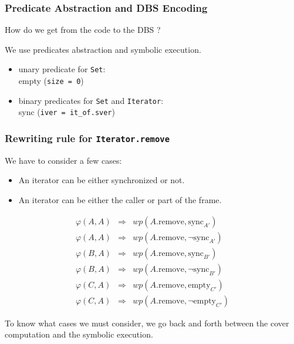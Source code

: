 \documentclass{beamer}
\begin{document}
\begin{frame}
  \frametitle{Predicate Abstraction and DBS Encoding}
  How do we get from the code to the DBS ?

  We use predicates abstraction and symbolic execution.
  \begin{itemize}
  \item unary predicate for {\tt Set}:\\
    empty ({\tt size = 0})
  \item binary predicates for {\tt Set} and {\tt Iterator}:\\
    sync ({\tt iver = it\_of.sver})
  \end{itemize}

\end{frame}

\begin{frame}
  \frametitle{Rewriting rule for {\tt Iterator.remove}}
    
  We have to consider a few cases:
  \begin{itemize}
  \item An iterator can be either synchronized or not.
  \item An iterator can be either the caller or part of the frame.
  \end{itemize}

  \begin{minipage}[b]{5cm}
  \begin{eqnarray*}
    \varphi(A,A) & \Rightarrow & wp(\text{$A$.remove}, \text{sync}_{A'}) \\
    \varphi(A,A) & \Rightarrow & wp(\text{$A$.remove}, \neg\text{sync}_{A'}) \\
    \varphi(B,A) & \Rightarrow & wp(\text{$A$.remove}, \text{sync}_{B'}) \\
    \varphi(B,A) & \Rightarrow & wp(\text{$A$.remove}, \neg\text{sync}_{B'}) \\
    \varphi(C,A) & \Rightarrow & wp(\text{$A$.remove}, \text{empty}_{C'}) \\
    \varphi(C,A) & \Rightarrow & wp(\text{$A$.remove}, \neg\text{empty}_{C'})
  \end{eqnarray*}
  \end{minipage}

  \vspace{2ex}

  To know what cases we must consider, we go back and forth between the cover computation and the symbolic execution.

\end{frame}
\end{document}
